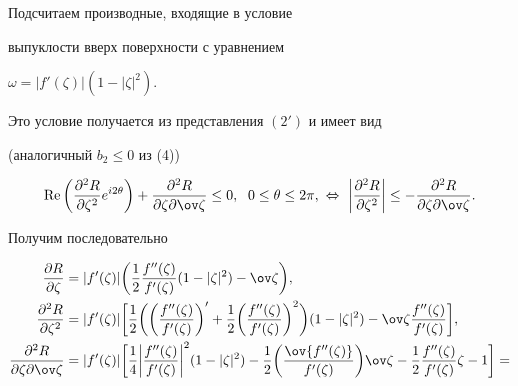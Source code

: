  


\begin{pf} 


Подсчитаем производные, входящие в условие 


выпуклости вверх поверхности с уравнением 


$\omega=|f'(\zeta)|(1-|\zeta|^2)$. 


Это условие получается из представления $(2')$ и имеет вид 


(аналогичный $b_2\le0$ из (4)) 


$$ 


\re\bigg(\frac{\partial^2R}{\partial \zeta^2}e^{i2\theta}\bigg)+ 


\frac{\partial^2R}{\partial\zeta\partial\ov\zeta}\le0, 


\ \; 0\le\theta\le2\pi,\ \Leftrightarrow\ \bigg| 


\frac{\partial^2R}{\partial\zeta^2}\bigg|\le 


-\frac{\partial^2R}{\partial\zeta\partial\ov\zeta}. 


$$ 


Получим последовательно 


\begin{align*} 


\frac{\partial R}{\partial \zeta}&=|f'(\zeta)|\bigg(\frac{1}{2} 


\frac{f''(\zeta)}{f'(\zeta)}(1-|\zeta|^2)-\ov\zeta\bigg),\\ 


% 


\frac{\partial^2R}{\partial \zeta^2}&=|f'(\zeta)|\bigg[ 


\frac{1}{2}\bigg(\bigg(\frac{f''(\zeta)}{f'(\zeta)}\bigg)'+ 


\frac{1}{2}\bigg(\frac{f''(\zeta)}{f'(\zeta)}\bigg)^2\bigg) 


(1-|\zeta|^2)-\ov\zeta\frac{f''(\zeta)}{f'(\zeta)}\bigg],\\ 


% 


\frac{\partial^2R}{\partial \zeta\partial \ov\zeta}&= 


|f'(\zeta)|\bigg[\frac{1}{4}\bigg|\frac{f''(\zeta)}{f'(\zeta)} 


\bigg|^2(1-|\zeta|^2)-\frac{1}{2}\bigg( 


\frac{\ov{f''(\zeta)}}{f'(\zeta)}\bigg)\ov\zeta-\frac{1}{2} 


\frac{f''(\zeta)}{f'(\zeta)}\zeta-1\bigg]= \\ 



\end{align*}
\end{pf}
